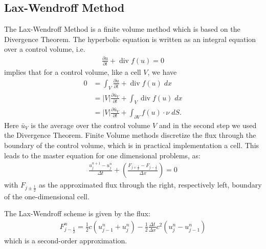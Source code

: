 \subsection{Lax-Wendroff Method}
The Lax-Wendroff Method is a finite volume method which is based on the Divergence
Theorem. The hyperbolic equation is written as an integral equation over a control
volume, i.e.
\begin{align*}
    \frac{\partial u}{\partial t} + \operatorname{div} f(u) = 0
\end{align*}
implies that for a control volume, like a cell $V$, we have
\begin{align*}
    0 &= \int_V\frac{\partial u}{\partial t} + \operatorname{div} f(u) \; dx \\
    &= |V| \frac{\partial \bar u_V}{\partial t} + \int_V \operatorname{div} f(u) \; dx \\
    &= |V| \frac{\partial \bar u_V}{\partial t} + \int_{\partial V} f(u) \cdot \nu \; dS.
\end{align*}
Here $\bar u_V$ is the average over the control volume $V$ and in the second step
we used the Divergence Theorem. Finite Volume methods discretize the flux through the
boundary of the control volume, which is in practical implementation a cell. This leads
to the master equation for one dimensional problems, as:
\begin{align}
    \label{eq:fvm}
    \frac{u^{n+1}_j - u^n_j}{\Delta t} + \left( \frac{F_{j + \tfrac{1}{2}} - F_{j - \tfrac{1}{2}}}{\Delta x}\right) = 0
\end{align}
with $F_{j \pm  \tfrac{1}{2}}$ as the approximated flux through the right,
respectively left, boundary of the one-dimensional cell. 

The Lax-Wendroff scheme is given by the flux:
\begin{align*}
    F_{j -\tfrac{1}{2}}^n = \frac{1}{2}c (u_{j-1}^n + u^n_j) - \frac{1}{2}\frac{\Delta t}{\Delta x}c^2(u^n_j - u^n_{j-1})
\end{align*}
which is a second-order approximation\cite{LeVeque2002}.

